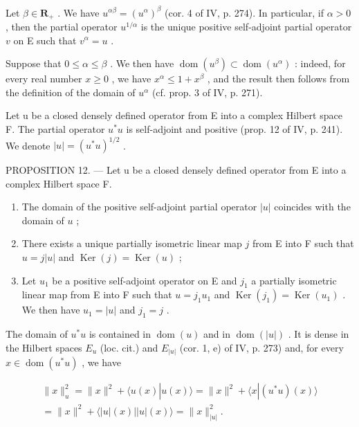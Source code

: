 Let \(\beta \in \mathbf{R}_{+}\) . We have \(u^{\alpha \beta} = (u^{\alpha})^{\beta}\) (cor. 4 of IV, p. 274). In particular, if \(\alpha > 0\) , then the partial operator \(u^{1 / \alpha}\) is the unique positive self-adjoint partial operator \(v\) on E such that \(v^{\alpha} = u\) .

Suppose that \(0 \leqslant \alpha \leqslant \beta\) . We then have \(\operatorname{dom}(u^{\beta}) \subset \operatorname{dom}(u^{\alpha})\) : indeed, for every real number \(x \geqslant 0\) , we have \(x^{\alpha} \leqslant 1 + x^{\beta}\) , and the result then follows from the definition of the domain of \(u^{\alpha}\) (cf. prop. 3 of IV, p. 271).

Let u be a closed densely defined operator from E into a complex Hilbert space F. The partial operator \(u^{*}u\) is self-adjoint and positive (prop. 12 of IV, p. 241). We denote \(|u| = (u^{*}u)^{1/2}\) .

PROPOSITION 12. --- Let u be a closed densely defined operator from E into a complex Hilbert space F.

\begin{enumerate}
\def\labelenumi{\alph{enumi})}
\item
  The domain of the positive self-adjoint partial operator \(|u|\) coincides with the domain of \(u\) ;
\item
  There exists a unique partially isometric linear map \(j\) from E into F such that \(u = j|u|\) and \(\operatorname{Ker}(j) = \operatorname{Ker}(u)\) ;
\item
  Let \(u_{1}\) be a positive self-adjoint operator on E and \(j_{1}\) a partially isometric linear map from E into F such that \(u = j_{1}u_{1}\) and \(\operatorname{Ker}(j_{1}) = \operatorname{Ker}(u_{1})\) . We then have \(u_{1} = |u|\) and \(j_{1} = j\) .
\end{enumerate}

The domain of \(u^{*}u\) is contained in \(\operatorname{dom}(u)\) and in \(\operatorname{dom}(|u|)\) . It is dense in the Hilbert spaces \(E_{u}\) (loc. cit.) and \(E_{|u|}\) (cor. 1, e) of IV, p. 273) and, for every \(x \in \operatorname{dom}(u^{*}u)\) , we have

\[
\begin{array}{c} \| x \| _ {u} ^ {2} = \| x \| ^ {2} + \langle u (x) | u (x) \rangle = \| x \| ^ {2} + \langle x | (u ^ {*} u) (x) \rangle \\ = \| x \| ^ {2} + \langle | u | (x) | | u | (x) \rangle = \| x \| _ {| u |} ^ {2}. \end{array}\tag{16}
\]


